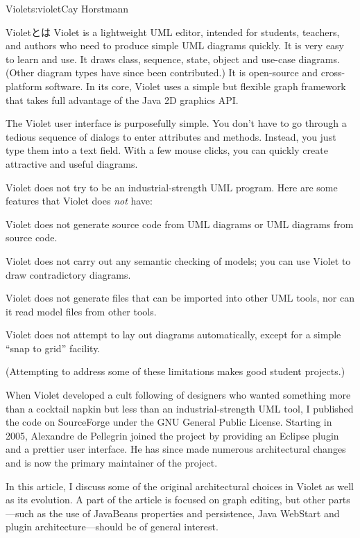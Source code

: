 \begin{aosachapter}{Violet}{s:violet}{Cay Horstmann}
\begin{aosasect1}{Violetとは}
Violet is a lightweight UML editor, intended for students, teachers,
and authors who need to produce simple UML diagrams quickly. It is
very easy to learn and use. It draws class, sequence, state, object
and use-case diagrams. (Other diagram types have since been
contributed.) It is open-source and cross-platform software. In its
core, Violet uses a simple but flexible graph framework that takes
full advantage of the Java 2D graphics API.

The Violet user interface is purposefully simple. You don't have to go
through a tedious sequence of dialogs to enter attributes and
methods. Instead, you just type them into a text field. With a few
mouse clicks, you can quickly create attractive and useful diagrams.

Violet does not try to be an industrial-strength UML program. Here are
some features that Violet does \emph{not} have:

\begin{aosaitemize}

\item Violet does not generate source code from UML diagrams or UML
  diagrams from source code.

\item Violet does not carry out any semantic checking of models; you
  can use Violet to draw contradictory diagrams.

\item Violet does not generate files that can be imported into other
  UML tools, nor can it read model files from other tools.

\item Violet does not attempt to lay out diagrams automatically,
  except for a simple ``snap to grid'' facility.

\end{aosaitemize}

\noindent (Attempting to address some of these limitations makes good student
projects.)

When Violet developed a cult following of designers who wanted
something more than a cocktail napkin but less than an
industrial-strength UML tool, I published the code on SourceForge
under the GNU General Public License. Starting in 2005, Alexandre de Pellegrin
joined the project by providing an Eclipse plugin and a prettier user
interface. He has since made numerous architectural changes and is now
the primary maintainer of the project.

In this article, I discuss some of the original architectural choices
in Violet as well as its evolution. A part of the article is focused
on graph editing, but other parts---such as the use of JavaBeans
properties and persistence, Java WebStart and plugin
architecture---should be of general interest.


\end{aosasect1}
\end{aosachapter}
